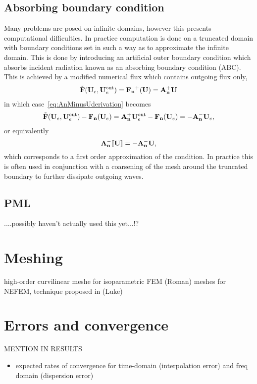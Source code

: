 \subsection{Absorbing boundary condition}
Many problems are posed on infinite domains, however this presents computational
difficulties. In practice computation is done on a truncated domain with
boundary conditions set in such a way as to approximate the infinite domain.
This is done by introducing an artificial outer boundary condition which absorbs
incident radiation known as an absorbing boundary condition (ABC)\cite{GivoliBook}.
This is achieved by a modified numerical flux which contains outgoing flux only,
\begin{align}
\tilde{\mathbf{F}}(\mathbf{U}_e,\mathbf{U}_e^{\textrm{out}}) = \mathbf{\mathbf{F}_n}^+(\mathbf{U}) = \mathbf{A}_\mathbf{n}^{+} \mathbf{U}
\end{align}
in which case~\eqref{eq:AnMinusUderivation} becomes
\begin{align}
  \tilde{\mathbf{F}}(\mathbf{U}_e,\mathbf{U}_e^{\textrm{out}}) - \mathbf{\mathbf{F}_n}(\mathbf{U}_e) = \mathbf{A}_\mathbf{n}^{+} \mathbf{U}_e^{\textrm{out}} - \mathbf{\mathbf{F}_n}(\mathbf{U}_e) = - \mathbf{A}_\mathbf{n}^{-} \mathbf{U}_e ,
\end{align}
or equivalently
$$
\mathbf{A}_\mathbf{n}^{-} \llbracket \mathbf{U} \rrbracket = - \mathbf{A}_\mathbf{n}^{-} \mathbf{U},
$$
which corresponds to a first order approximation of the \SilverMuller condition.
In practice this is often used in conjunction with a coarsening of the mesh around the truncated boundary to further dissipate outgoing waves\cite{Hall2004140}.

\subsection{PML}
....possibly haven't actually used this yet...!?


\section{Meshing}
high-order curvilinear meshe for isoparametric FEM (Roman) \cite{HO-Meshing}
meshes for NEFEM, technique proposed in (Luke) \cite{NEFEMmeshes}

\section{Errors and convergence}
MENTION IN RESULTS
\begin{itemize}
  \item expected rates of convergence for time-domain (interpolation error) and freq domain (dispersion error)
\end{itemize}

